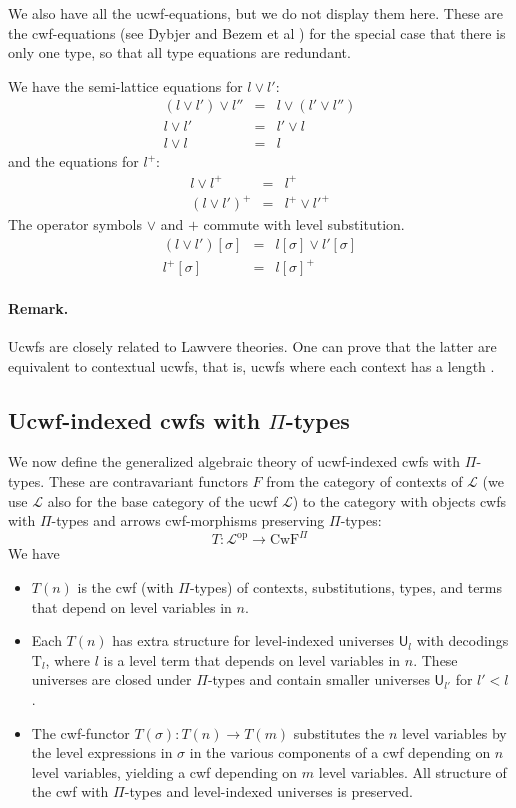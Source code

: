 \documentclass[11pt,a4paper]{article}
\theoremstyle{definition}
\newcommand{\UU}{\mathsf{U}}
\def\UU{\mathsf{U}}
\newcommand{\Ta}{\mathrm{T}}
\def\L{{\mathcal{L}}}
\def\CwF{\mathrm{CwF}}
\begin{document}
We also have all the ucwf-equations, but we do not display them here. These are the cwf-equations (see Dybjer \cite{dybjer:torino} and Bezem et al \cite{BezemCDE22})
for the special case that there is only one type, so that all type equations are redundant.

We have the semi-lattice equations for $l \vee l'$:
\begin{eqnarray*}
(l \vee l') \vee l'' &=& l \vee (l' \vee l'')\\
l \vee l' &=& l'\vee l\\
l \vee l &=& l
\end{eqnarray*}
and the equations for $l^+$:
\begin{eqnarray*}
l \vee l^+ &=& l^+\\
(l\vee l')^+ &=& l^+\vee l'^+
\end{eqnarray*}
The operator symbols $\vee$ and $+$ commute with level substitution.
\begin{eqnarray*}
(l \vee l')[\sigma] &=& l[\sigma] \vee l' [\sigma]\\
 l^+[\sigma] &=&  l[\sigma]^+
\end{eqnarray*}
\paragraph{Remark.} Ucwfs are closely related to Lawvere theories. One can prove that the latter are equivalent to contextual ucwfs, that is, ucwfs where each context has a length \cite{CCD:lambek}.

\subsection{Ucwf-indexed cwfs  with $\Pi$-types}

We now define the generalized algebraic theory of ucwf-indexed cwfs with $\Pi$-types. These are contravariant functors $F$ from the category of contexts of $\L$ (we use $\L$ also for the base category of the ucwf $\L$)  to the category with objects cwfs with $\Pi$-types and arrows cwf-morphisms preserving $\Pi$-types:
$$
T : \L^\mathrm{op} \to \CwF^{\Pi}
$$
We have
\begin{itemize}
\item
$T(n)$ is the cwf (with $\Pi$-types) of contexts, substitutions, types, and terms that depend on level variables in $n$.
\item
Each $T(n)$ has extra structure for level-indexed universes $\UU_l$ with decodings $\Ta_l$, where $l$ is a level term that depends on level variables in $n$. These universes are closed under $\Pi$-types and contain smaller universes $\UU_{l'}$ for $l' < l$.
\item
The cwf-functor $T(\sigma) : T(n) \to T(m)$ substitutes the $n$ level variables by the level expressions in $\sigma$ in the various components of a cwf depending on $n$ level variables, yielding a cwf depending on $m$ level variables. All structure of the cwf with $\Pi$-types and level-indexed universes is preserved.
\end{itemize}
\end{document}
